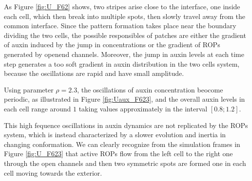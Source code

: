 As Figure \ref{fig:U_F62} shows, two stripes arise close to the interface, one inside each cell, which then break into multiple spots, then slowly travel away from the common interface. Since the pattern formation takes place near the boundary dividing the two cells, the possible responsibles of patches are either the gradient of auxin induced by the jump in concentrations or the gradient of ROPs generated by openend channels. Moreover, the jump in auxin levels at each time step generates a too soft gradient in auxin distribution in the two cells system, because the oscillations are rapid and have small amplitude.

Using parameter $\rho = 2.3$, the oscillations of auxin concentration beocome periodic, as illustrated in Figure \ref{fig:Uaux_F623}, and the overall auxin levels in each cell range around $1$ taking values approximately in the interval $\left[0.8; 1.2\right]$.

This high fequence oscillations in auxin dynamics are not replicated by the ROPs system, which is instead characterized by a slower evolution and inertia in changing conformation.
We can clearly recognize from the simulation frames in Figure \ref{fig:U_F623} that active ROPs flow from the left cell to the right one through the open channels and then two symmetric spots are formed one in each cell moving towards the exterior.

